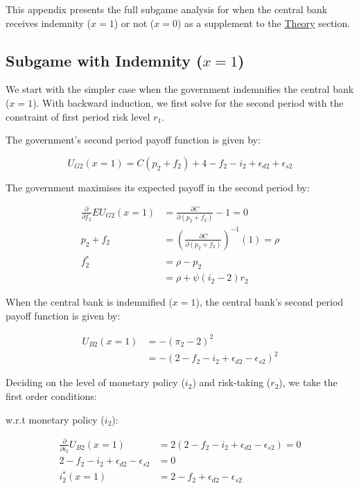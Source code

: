 \documentclass[
  a4paper,
  abstract=true]{scrartcl}
\theoremstyle{definition}
\begin{document}
This appendix presents the full subgame analysis for when the central
bank receives indemnity (\(x=1\)) or not (\(x=0\)) as a supplement to
the \hyperref[sec-theory]{Theory} section.

\subsection{\texorpdfstring{Subgame with Indemnity
(\(x=1\))}{Subgame with Indemnity (x=1)}}\label{sec-model-app-indem}

We start with the simpler case when the government indemnifies the
central bank (\(x=1\)). With backward induction, we first solve for the
second period with the constraint of first period risk level \(r_1\).

The government's second period payoff function is given by:

\[
U_{G2}(x=1)= C(p_2+f_2) + 4 -f_2-i_2 +\epsilon_{d2}+\epsilon_{s2}
\]

The government maximises its expected payoff in the second period by:

\begin{align*}
\frac{\partial}{\partial f_2} EU_{G2}(x=1) &= \frac{\partial C}{\partial (p_2 + f_2)} -1=0 \\
p_2+f_2 &= \left( \frac{\partial C}{\partial (p_2 + f_2)} \right)^{-1}(1)=\rho \\
f_2^*&= \rho -p_2 \\
&=\rho +\psi(i_2-2)r_2
\end{align*}

When the central bank is indemnified (\(x=1\)), the central bank's
second period payoff function is given by:

\begin{align*}
U_{B2}(x=1) &=-(\pi_2-2)^2 \\
&=-(2-f_2-i_2+\epsilon_{d2}-\epsilon_{s2})^2
\end{align*}

Deciding on the level of monetary policy (\(i_2\)) and risk-taking
(\(r_2\)), we take the first order conditions:

w.r.t monetary policy (\(i_2\)):

\begin{align}
\frac{\partial}{\partial i_2} U_{B2}(x=1) &= 2(2-f_2-i_2+\epsilon_{d2}-\epsilon_{s2})=0 \nonumber \\
2-f_2-i_2+\epsilon_{d2}-\epsilon_{s2}&=0 \label{eq-inftarget} \\
i_2^*(x=1) &= 2-f_2+\epsilon_{d2}-\epsilon_{s2} \nonumber
\end{align}
\end{document}
